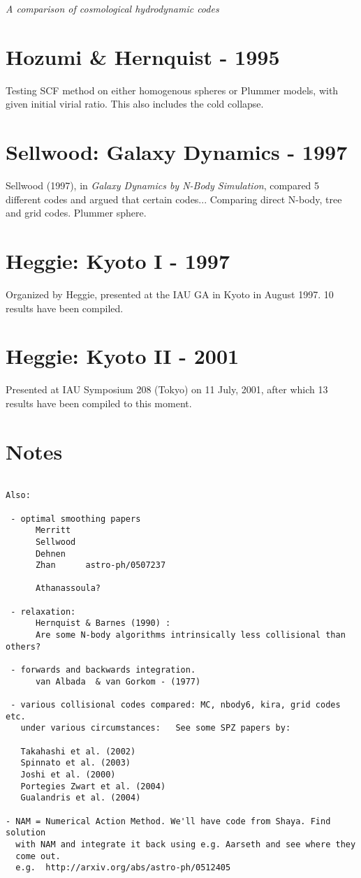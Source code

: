 {\it A comparison of cosmological hydrodynamic codes}

\section{Hozumi \& Hernquist - 1995}

Testing SCF method on either homogenous spheres or Plummer models, with
given initial virial ratio. This also includes the cold collapse.

\section{Sellwood: Galaxy Dynamics - 1997}

Sellwood (1997), in {\it Galaxy Dynamics by N-Body Simulation},
compared 5 different codes and argued that certain codes...
Comparing direct N-body, tree and grid codes. Plummer
sphere.


\section{Heggie: Kyoto I - 1997}

Organized by Heggie, presented at the IAU GA in Kyoto in August 1997. 10 results
have been compiled.

\section{Heggie: Kyoto II - 2001}

Presented at IAU Symposium 208 (Tokyo) on 11 July, 2001, after which 13 results
have been compiled to this moment.

\section{Notes}
\begin{verbatim}

Also:

 - optimal smoothing papers
      Merritt
      Sellwood
      Dehnen
      Zhan      astro-ph/0507237

      Athanassoula?

 - relaxation:
      Hernquist & Barnes (1990) : 
      Are some N-body algorithms intrinsically less collisional than others?

 - forwards and backwards integration. 
      van Albada  & van Gorkom - (1977)

 - various collisional codes compared: MC, nbody6, kira, grid codes etc.
   under various circumstances:   See some SPZ papers by:

   Takahashi et al. (2002)
   Spinnato et al. (2003)  
   Joshi et al. (2000)
   Portegies Zwart et al. (2004)
   Gualandris et al. (2004)

- NAM = Numerical Action Method. We'll have code from Shaya. Find solution
  with NAM and integrate it back using e.g. Aarseth and see where they 
  come out.
  e.g.  http://arxiv.org/abs/astro-ph/0512405
   

\end{verbatim}

